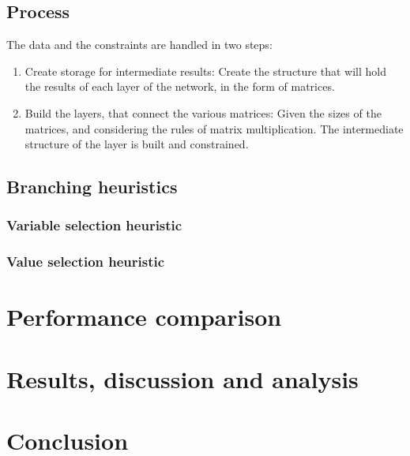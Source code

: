 \documentclass[a4paper, 10pt]{article}
\begin{document}
% 

\subsection*{Process}

The data and the constraints are handled in two steps:
\begin{enumerate}
    \item{Create storage for intermediate results}: 
        Create the structure that will hold the results of each layer of the
        network, in the form of matrices.

    \item{Build the layers, that connect the various matrices}:
        Given the sizes of the matrices, and considering the rules of matrix
        multiplication. The intermediate structure of the layer is built and
        constrained.
\end{enumerate}

\subsection*{Branching heuristics}

\subsubsection*{Variable selection heuristic}

\subsubsection*{Value selection heuristic}

\section{Performance comparison}

\section{Results, discussion and analysis}

\section{Conclusion}



\end{document}
